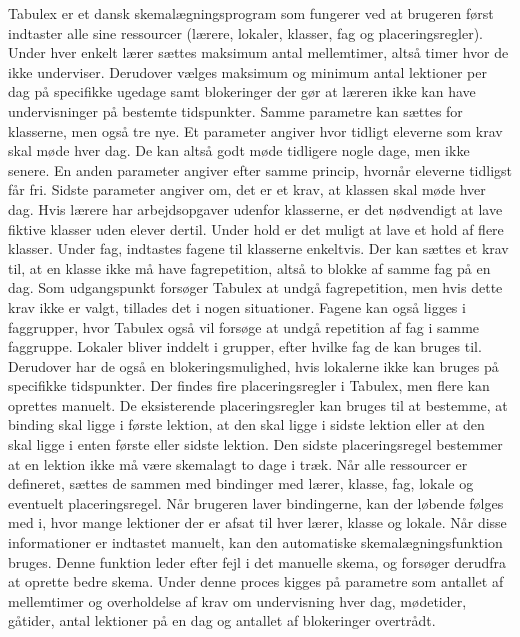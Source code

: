 Tabulex er et dansk skemalægningsprogram som fungerer ved at brugeren først indtaster alle sine ressourcer (lærere, lokaler, klasser, fag og placeringsregler). 
Under hver enkelt lærer sættes maksimum antal mellemtimer, altså timer hvor de ikke underviser. Derudover vælges maksimum og minimum antal lektioner per dag på specifikke ugedage samt blokeringer der gør at læreren ikke kan have undervisninger på bestemte tidspunkter. 
Samme parametre kan sættes for klasserne, men også tre nye. Et parameter angiver hvor tidligt eleverne som krav skal møde hver dag. De kan altså godt møde tidligere nogle dage, men ikke senere. En anden parameter angiver efter samme princip, hvornår eleverne tidligst får fri. Sidste parameter angiver om, det er et krav, at klassen skal møde hver dag. Hvis lærere har arbejdsopgaver udenfor klasserne, er det nødvendigt at lave fiktive klasser uden elever dertil.
Under hold er det muligt at lave et hold af flere klasser.
Under fag, indtastes fagene til klasserne enkeltvis. Der kan sættes et krav til, at en klasse ikke må have fagrepetition, altså to blokke af samme fag på en dag. Som udgangspunkt forsøger Tabulex at undgå fagrepetition, men hvis dette krav ikke er valgt, tillades det i nogen situationer. Fagene kan også ligges i faggrupper, hvor Tabulex også vil forsøge at undgå repetition af fag i samme faggruppe.
Lokaler bliver inddelt i grupper, efter hvilke fag de kan bruges til. Derudover har de også en blokeringsmulighed, hvis lokalerne ikke kan bruges på specifikke tidspunkter.
Der findes fire placeringsregler i Tabulex, men flere kan oprettes manuelt. De eksisterende placeringsregler kan bruges til at bestemme, at binding skal ligge i første lektion, at den skal ligge i sidste lektion eller at den skal ligge i enten første eller sidste lektion. Den sidste placeringsregel bestemmer at en lektion ikke må være skemalagt to dage i træk.
Når alle ressourcer er defineret, sættes de sammen med bindinger med lærer, klasse, fag, lokale og eventuelt placeringsregel. Når brugeren laver bindingerne, kan der løbende følges med i, hvor mange lektioner der er afsat til hver lærer, klasse og lokale.
Når disse informationer er indtastet manuelt, kan den automatiske skemalægningsfunktion bruges. Denne funktion leder efter fejl i det manuelle skema, og forsøger derudfra at oprette bedre skema. Under denne proces kigges på parametre som antallet af mellemtimer og overholdelse af krav om undervisning hver dag, mødetider, gåtider, antal lektioner på en dag og antallet af blokeringer overtrådt.
